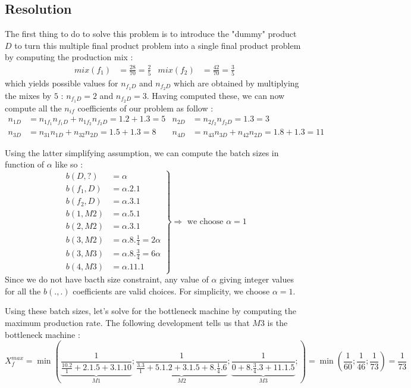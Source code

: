 \subsection{Resolution}

The first thing to do to solve this problem is to introduce the "dummy" product $D$ to turn this multiple final product problem into a single final product problem by computing the production mix : 
\begin{align*} mix(f_1) &= \frac{28}{70} = \frac{2}{5} & mix(f_2) &= \frac{42}{70} = \frac{3}{5}  \end{align*}
which yields possible values for $n_{f_1D}$ and $n_{f_2D}$ which are obtained by multiplying the mixes by $5$ : $n_{f_1D} = 2$ and $n_{f_2D} = 3$. Having computed these, we can now compute all the $n_{if}$ coefficients of our problem as follow : 
\begin{align*}
    n_{1D} &= n_{1f_1}n_{f_1D} + n_{1f_2}n_{f_2D} = 1.2 + 1.3 = 5 &
    n_{2D} &= n_{2f_2}n_{f_2D} = 1.3 = 3 \\
    n_{3D} &= n_{31}n_{1D} + n_{32}n_{2D} = 1.5 + 1.3 = 8 &
    n_{4D} &= n_{43}n_{3D} + n_{42}n_{2D} = 1.8 + 1.3 = 11
\end{align*}

Using the latter simplifying assumption, we can compute the batch sizes in function of $\alpha$ like so :
\[
    \left.
    \begin{split}
        b(D, ?) &= \alpha\\
        b(f_1, D) &= \alpha.2.1\\
        b(f_2, D) &= \alpha.3.1\\
        b(1, M2) &= \alpha.5.1\\
        b(2, M2) &= \alpha.3.1\\
        b(3, M2) &= \alpha.8.\frac{1}{4} = 2\alpha\\
        b(3, M3) &= \alpha.8.\frac{3}{4} = 6\alpha\\
        b(4, M3) &= \alpha.11.1
    \end{split}
    \right\}\Rightarrow\textrm{ we choose }\alpha = 1
\] Since we do not have bacth size constraint, any value of $\alpha$ giving integer values for all the $b(.,.)$ coefficients are valid choices. For simplicity, we choose $\alpha = 1$. 

Using these batch sizes, let's solve for the bottleneck machine by computing the maximum production rate. The following development tells us that $M3$ is the bottleneck machine :
\[
    X_f^{max} = \min\left(
        \underbrace{\frac{1}{ \frac{10.2}{1} + 2.1.5 + 3.1.10 }}_{M1} ;
        \underbrace{\frac{1}{ \frac{3.3}{1} + 5.1.2 + 3.1.5 + 8.\frac{1}{4}.6 }}_{M2} ;
        \underbrace{\frac{1}{ 0 + 8.\frac{3}{4}.3 + 11.1.5 }}_{M3} ;
    \right)
    = \min\left( \frac{1}{60} ; \frac{1}{46} ; \frac{1}{73} \right) = \frac{1}{73}
\]

